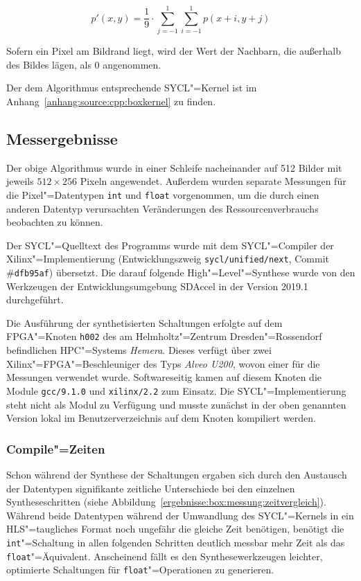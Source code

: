 \begin{equation}
    p'(x, y) = \frac{1}{9} \cdot \sum_{j = {-1}}^{1} \sum_{i = {-1}}^{1} p(x + i, y + j)
\end{equation}

Sofern ein Pixel am Bildrand liegt, wird der Wert der Nachbarn, die außerhalb
des Bildes lägen, als $0$ angenommen.

Der dem Algorithmus entsprechende SYCL"=Kernel ist im
Anhang~\ref{anhang:source:cpp:boxkernel} zu finden.

\subsection{Messergebnisse}

Der obige Algorithmus wurde in einer Schleife nacheinander auf \num{512} Bilder
mit jeweils $512 \times 256$ Pixeln angewendet. Außerdem wurden separate
Messungen für die Pixel"=Datentypen \texttt{int} und \texttt{float}
vorgenommen, um die durch einen anderen Datentyp verursachten Veränderungen des
Ressourcenverbrauchs beobachten zu können.

Der SYCL"=Quelltext des Programms wurde mit dem SYCL"=Compiler der
Xilinx"=Implementierung (Entwicklungszweig \texttt{sycl/unified/next},
Commit \#\texttt{dfb95af}) übersetzt. Die darauf folgende High"=Level"=Synthese
wurde von den Werkzeugen der Entwicklungsumgebung SDAccel in der Version 2019.1
durchgeführt.

Die Ausführung der synthetisierten Schaltungen erfolgte auf dem FPGA"=Knoten
\texttt{h002} des am Helmholtz"=Zentrum Dresden"=Rossendorf befindlichen
HPC"=Systems \textit{Hemera}. Dieses verfügt über zwei
Xilinx"=FPGA"=Beschleuniger des Typs \textit{Alveo U200}, wovon einer für die
Messungen verwendet wurde. Softwareseitig kamen auf diesem Knoten die Module
\texttt{gcc/9.1.0} und \texttt{xilinx/2.2} zum Einsatz. Die
SYCL"=Implementierung steht nicht als Modul zu Verfügung und musste zunächst
in der oben genannten Version lokal im Benutzerverzeichnis auf dem Knoten
kompiliert werden.

\subsubsection{Compile"=Zeiten}

Schon während der Synthese der Schaltungen ergaben sich durch den Austausch der
Datentypen signifikante zeitliche Unterschiede bei den einzelnen
Syntheseschritten (siehe Abbildung~\ref{ergebnisse:box:messung:zeitvergleich}).
Während beide Datentypen während der Umwandlung des SYCL"=Kernels in ein
HLS"=taugliches Format noch ungefähr die gleiche Zeit benötigen, benötigt die
\texttt{int}"=Schaltung in allen folgenden Schritten deutlich messbar mehr Zeit
als das \texttt{float}"=Äquivalent. Anscheinend fällt es den
Synthesewerkzeugen leichter, optimierte Schaltungen für
\texttt{float}"=Operationen zu generieren.

